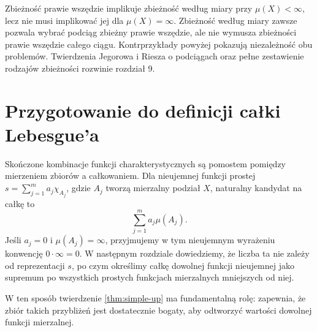 \begin{uwaga}
Zbieżność prawie wszędzie implikuje zbieżność
według miary przy $\mu(X)<\infty$, lecz nie musi
implikować jej dla $\mu(X)=\infty$.
Zbieżność według miary zawsze pozwala wybrać podciąg
zbieżny prawie wszędzie, ale nie wymusza zbieżności
prawie wszędzie całego ciągu. Kontrprzykłady powyżej
pokazują niezależność obu problemów. Twierdzenia
Jegorowa i Riesza o podciągach oraz pełne zestawienie
rodzajów zbieżności rozwinie rozdział 9.
\end{uwaga}

\section{Przygotowanie do definicji całki Lebesgue'a}

Skończone kombinacje funkcji charakterystycznych są
pomostem pomiędzy mierzeniem zbiorów a całkowaniem.
Dla nieujemnej funkcji prostej $s=\sum_{j=1}^m
a_j\chi_{A_j}$, gdzie $A_j$ tworzą mierzalny
podział $X$, naturalny kandydat na całkę to
\[
\sum_{j=1}^m a_j\mu(A_j).
\]
Jeśli $a_j=0$ i $\mu(A_j)=\infty$, przyjmujemy
w tym nieujemnym wyrażeniu konwencję $0\cdot\infty=0$.
W następnym rozdziale dowiedziemy, że liczba ta
nie zależy od reprezentacji $s$, po czym określimy
całkę dowolnej funkcji nieujemnej jako supremum
po wszystkich prostych funkcjach mierzalnych
mniejszych od niej.

W ten sposób twierdzenie \ref{thm:simple-up}
ma fundamentalną rolę: zapewnia, że zbiór takich
przybliżeń jest dostatecznie bogaty, aby odtworzyć
wartości dowolnej funkcji mierzalnej.
